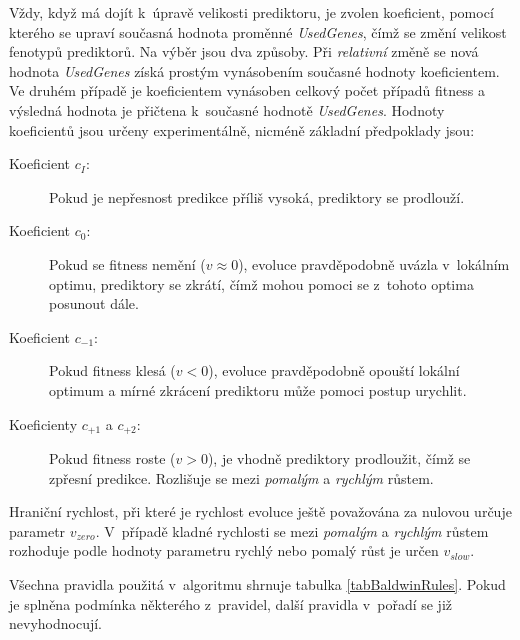 Vždy, když má dojít k~úpravě velikosti prediktoru, je zvolen koeficient, pomocí kterého se upraví současná hodnota proměnné \emph{UsedGenes}, čímž se změní velikost fenotypů prediktorů. Na výběr jsou dva způsoby. Při \emph{relativní} změně se nová hodnota \emph{UsedGenes} získá prostým vynásobením současné hodnoty koeficientem. Ve druhém případě je koeficientem vynásoben celkový počet případů fitness a výsledná hodnota je přičtena k~současné hodnotě \emph{UsedGenes}. Hodnoty koeficientů jsou určeny experimentálně, nicméně základní předpoklady jsou:

\begin{description}
    \item[Koeficient $c_I$:] Pokud je nepřesnost predikce příliš vysoká, prediktory se prodlouží.
    \item[Koeficient $c_{0}$:] Pokud se fitness nemění ($v \approx 0$), evoluce pravděpodobně uvázla v~lokálním optimu, prediktory se zkrátí, čímž mohou pomoci se z~tohoto optima posunout dále.
    \item[Koeficient $c_{-1}$:] Pokud fitness klesá ($v < 0$), evoluce pravděpodobně opouští lokální optimum a mírné zkrácení prediktoru může pomoci postup urychlit.
    \item[Koeficienty $c_{+1}$ a $c_{+2}$:] Pokud fitness roste ($v > 0$), je vhodně prediktory prodloužit, čímž se zpřesní predikce. Rozlišuje se mezi \emph{pomalým} a \emph{rychlým} růstem.
\end{description}

Hraniční rychlost, při které je rychlost evoluce ještě považována za nulovou určuje parametr $v_\mathit{zero}$. V~případě kladné rychlosti se mezi \emph{pomalým} a \emph{rychlým} růstem rozhoduje podle hodnoty parametru rychlý nebo pomalý růst je určen $v_\mathit{slow}$.

Všechna pravidla použitá v~algoritmu shrnuje tabulka \ref{tabBaldwinRules}. Pokud je splněna podmínka některého z~pravidel, další pravidla v~pořadí se již nevyhodnocují.

